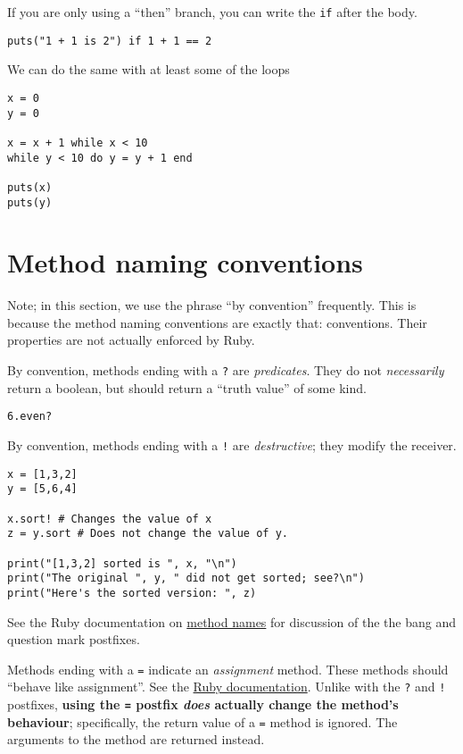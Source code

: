 \documentclass[11pt]{article}
\begin{document}
If you are only using a “then” branch, you can write
the \texttt{if} after the body.
\begin{verbatim}
puts("1 + 1 is 2") if 1 + 1 == 2
\end{verbatim}


We can do the same with at least some of the loops
\begin{verbatim}
x = 0
y = 0

x = x + 1 while x < 10
while y < 10 do y = y + 1 end

puts(x)
puts(y)
\end{verbatim}

\section{Method naming conventions}
\label{sec:orgedf48e4}
Note; in this section, we use the phrase “by convention” frequently.
This is because the method naming conventions are exactly that:
conventions. Their properties are not actually enforced by Ruby.

By convention, methods ending with a \texttt{?} are \emph{predicates}.
They do not \emph{necessarily} return a boolean, but should
return a “truth value” of some kind.
\begin{verbatim}
6.even?
\end{verbatim}

By convention, methods ending with a \texttt{!} are \emph{destructive};
they modify the receiver.
\begin{verbatim}
x = [1,3,2]
y = [5,6,4]

x.sort! # Changes the value of x
z = y.sort # Does not change the value of y. 

print("[1,3,2] sorted is ", x, "\n")
print("The original ", y, " did not get sorted; see?\n")
print("Here's the sorted version: ", z)
\end{verbatim}

See the Ruby documentation on \href{https://docs.ruby-lang.org/en/2.7.0/doc/syntax/methods\_rdoc.html\#label-Method+Names}{method names}
for discussion of the the bang and question mark postfixes.

Methods ending with a \texttt{=} indicate an \emph{assignment} method.
These methods should “behave like assignment”.
See the \href{https://docs.ruby-lang.org/en/2.7.0/doc/syntax/assignment\_rdoc.html\#label-Assignment+Methods}{Ruby documentation}.
Unlike with the \texttt{?} and \texttt{!} postfixes,
\textbf{using the \texttt{=} postfix \emph{does} actually change the method's behaviour};
specifically, the return value of a \texttt{=} method is ignored.
The arguments to the method are returned instead.
\end{document}
